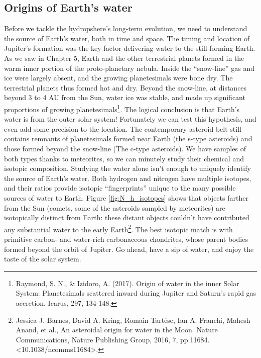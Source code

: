 {\subsection{Origins of Earth's water}
Before we tackle the hydropshere's long-term evolution, we need to understand the source of Earth's water, both in time and space. The timing and location of Jupiter's formation was the key factor delivering water to the still-forming Earth. As we saw in Chapter 5, Earth and the other terrestrial planets formed in the warm inner portion of the proto-planetary nebula. Inside the ``snow-line'' gas and ice were largely absent, and the growing planetesimals were bone dry. The terrestrial planets thus formed hot and dry. Beyond the snow-line, at distances beyond 3 to 4 AU from the Sun, water ice was stable, and made up significant proportions of growing planetesimals\footnote{Raymond, S. N., \& Izidoro, A. (2017). Origin of water in the inner Solar System: Planetesimals scattered inward during Jupiter and Saturn's rapid gas accretion. Icarus, 297, 134-148.}. The logical conclusion is that Earth's water is from the outer solar system! Fortunately we can test this hypothesis, and even add some precision to the location. The contemporary asteroid belt still contains remnants of planetesimals formed near Earth (the s-type asteroids) and those formed beyond the snow-line (The c-type asteroids). We have samples of both types thanks to meteorites, so we can minutely study their chemical and isotopic composition. Studying the water alone isn't enough to uniquely identify the source of Earth's water. Both hydrogen and nitrogen have multiple  isotopes, and their ratios provide isotopic ``fingerprints'' unique to the many possible sources of water to Earth. Figure \ref{fig:N_h_isotopes} shows that objects farther from the Sun (comets, some of the asteroids sampled by meteorites) are isotopically distinct from Earth: these distant objects couldn't have contributed any substantial water to the early Earth\footnote{Jessica J. Barnes, David A. Kring, Romain Tart\'ese, Ian A. Franchi, Mahesh Anand, et al., An asteroidal origin for water in the Moon. Nature Communications, Nature Publishing Group, 2016, 7, pp.11684. <10.1038/ncomms11684>.}. The best isotopic match is with primitive carbon- and water-rich carbonaceous chondrites, whose parent bodies formed beyond the orbit of Jupiter. Go ahead, have a sip of water, and enjoy the taste of the solar system.\\

}
